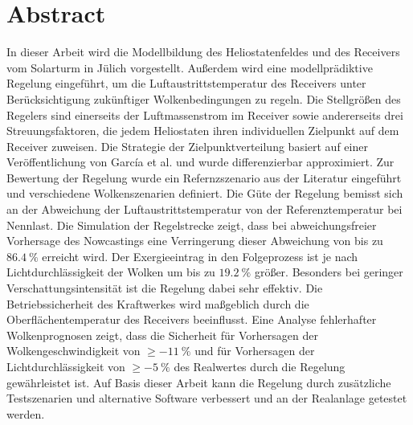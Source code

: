 \chapter*{Abstract}
In dieser Arbeit wird die Modellbildung des Heliostatenfeldes und des Receivers vom Solarturm in Jülich vorgestellt.
Außerdem wird eine modellprädiktive Regelung eingeführt, um die Luftaustrittstemperatur des Receivers unter Berücksichtigung zukünftiger Wolkenbedingungen zu regeln.
Die Stellgrößen des Regelers sind einerseits der Luftmassenstrom im Receiver sowie andererseits drei Streuungsfaktoren, die jedem Heliostaten ihren individuellen Zielpunkt auf dem Receiver zuweisen.
Die Strategie der Zielpunktverteilung basiert auf einer Veröffentlichung von García et al. \cite{Garcia2} und wurde differenzierbar approximiert.
Zur Bewertung der Regelung wurde ein Refernzszenario aus der Literatur eingeführt und verschiedene Wolkenszenarien definiert.
Die Güte der Regelung bemisst sich an der Abweichung der Luftaustrittstemperatur von der Referenztemperatur bei Nennlast.
Die Simulation der Regelstrecke zeigt, dass bei abweichungsfreier Vorhersage des Nowcastings eine Verringerung dieser Abweichung von bis zu $\SI{86.4}{\percent}$ erreicht wird.
Der Exergieeintrag in den Folgeprozess ist je nach Lichtdurchlässigkeit der Wolken um bis zu $\SI{19.2}{\percent}$ größer.
Besonders bei geringer Verschattungsintensität ist die Regelung dabei sehr effektiv.
Die Betriebssicherheit des Kraftwerkes wird maßgeblich durch die Oberflächentemperatur des Receivers beeinflusst.
Eine Analyse fehlerhafter Wolkenprognosen zeigt, dass die Sicherheit für Vorhersagen der Wolkengeschwindigkeit von $\geq\SI{-11}{\percent}$ und für Vorhersagen der Lichtdurchlässigkeit von $\geq\SI{-5}{\percent}$ des Realwertes durch die Regelung gewährleistet ist.
Auf Basis dieser Arbeit kann die Regelung durch zusätzliche Testszenarien und alternative Software verbessert und an der Realanlage getestet werden.
